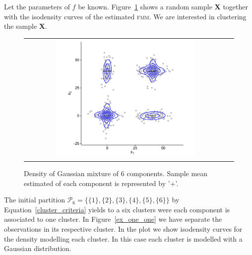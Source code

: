 \documentclass[submit]{smj}
\theoremstyle{definition}
\newcommand{\fmm}{\textsc{fmm}\xspace}
\begin{document}
Let the parameters of $f$ be known. Figure~\ref{ex_mixture} shows a random sample \textbf{X} together with the isodensity curves of the estimated \fmm. We are interested in clustering the sample \textbf{X}.

\begin{figure}[htbp]
\begin{center}
\begin{tabular}{cc}
  \includegraphics[width=0.7\textwidth]{figures/partition-example-mixture.pdf} \\
 \end{tabular}
 \caption{Density of Gaussian mixture of 6 components. Sample mean estimated of each component is represented by '+'.}\label{ex_mixture}
\end{center}
\end{figure}

The initial partition  $\mathcal{P}_6 = \{ \{1\},\{2\}, \{3\}, \{4\}, \{5\}, \{6\} \}$  by Equation~\ref{cluster_criteria} yields to a six clusters were each component is associated to one cluster. In Figure~\ref{ex_one_one} we have separate the observations in its respective cluster. In the plot we show isodensity curves for the density modelling each cluster. In this case each cluster is modelled with a Gaussian distribution.
\end{document}
